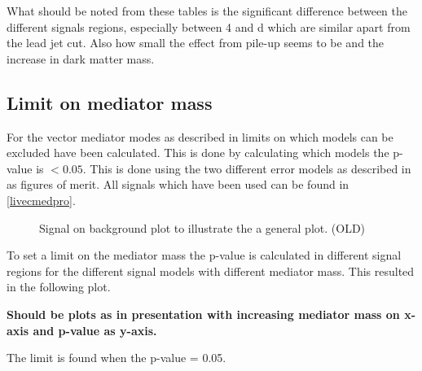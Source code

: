 What should be noted from these tables is the significant difference between the different signals regions, especially between 4 and d which are similar apart from the lead jet cut. Also how small the effect from pile-up seems to be and the increase in dark matter mass.

\newpage
\subsection{Limit on mediator mass}\label{sec:res:subsec:Mm}
For the vector mediator modes as described in  limits on which models can be excluded have been calculated. This is done by calculating which models the p-value is $<0.05$. This is done using the two different error models as described in  as figures of merit. All signals which have been used can be found in \ref{livecmedpro}.


 \begin{figure}[H] %
    \hfill
    \caption{Signal on background plot to illustrate the a general plot. (OLD) }
    \label{fig:sigback}
  \end{figure}

To set a limit on the mediator mass the p-value is calculated in different signal regions for the different signal models with different mediator mass. This resulted in the following plot.

\textbf{Should be plots as in presentation with increasing mediator mass on x-axis and p-value as y-axis.}

The limit is found when the p-value = 0.05.

